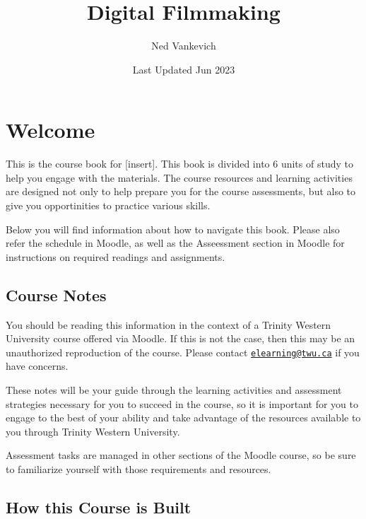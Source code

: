 \documentclass[
]{book}
\title{Digital Filmmaking}
\author{Ned Vankevich}
\date{Last Updated Jun 2023}
\begin{document}
\maketitle

{
\setcounter{tocdepth}{1}
\tableofcontents
}
\hypertarget{welcome}{%
\chapter*{Welcome}\label{welcome}}

This is the course book for {[}insert{]}. This book is divided into 6 units of study to help you engage with the materials. The course resources and learning activities are designed not only to help prepare you for the course assessments, but also to give you opportinities to practice various skills.

Below you will find information about how to navigate this book. Please also refer the schedule in Moodle, as well as the Asseessment section in Moodle for instructions on required readings and assignments.

\hypertarget{course-notes}{%
\section*{Course Notes}\label{course-notes}}

You should be reading this information in the context of a Trinity Western University course offered via Moodle. If this is not the case, then this may be an unauthorized reproduction of the course. Please contact \href{mailto:elearning@twu.ca}{\nolinkurl{elearning@twu.ca}} if you have concerns.

These notes will be your guide through the learning activities and assessment strategies necessary for you to succeed in the course, so it is important for you to engage to the best of your ability and take advantage of the resources available to you through Trinity Western University.

Assessment tasks are managed in other sections of the Moodle course, so be sure to familiarize yourself with those requirements and resources.

\hypertarget{how-this-course-is-built}{%
\section*{How this Course is Built}\label{how-this-course-is-built}}
\end{document}
